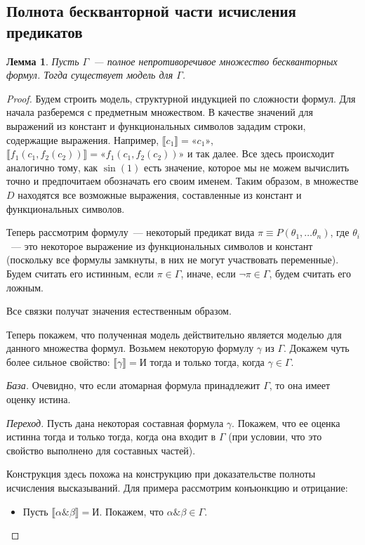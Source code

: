 \documentclass[a4paper,11pt]{article}
\newtheorem{lmm}[thm]{Лемма}
\theoremstyle{definition}
\newcommand{\True}{\text{И}}
\newcommand{\amp}{\mathbin{\&}}
\newcommand{\gn}[1]{\text{«}#1\text{»}}
\begin{document}
\subsection{Полнота бескванторной части исчисления предикатов}
\begin{lmm}\label{lmm:qf-model}
Пусть $\Gamma$~--- полное непротиворечивое множество бескванторных формул. Тогда
существует модель для $\Gamma$.
\end{lmm}
\begin{proof}
Будем строить модель, структурной индукцией по сложности формул. Для начала
разберемся с предметным множеством. В качестве значений для выражений из
констант и функциональных символов зададим строки, содержащие выражения.
Например, $\llbracket c_1\rrbracket = \gn{c_1}$, $\llbracket f_1(c_1,
f_2(c_2))\rrbracket = \gn{f_1(c_1, f_2(c_2))}$ и так далее. Все здесь
происходит аналогично тому, как $\sin(1)$ есть значение, которое мы не можем
вычислить точно и предпочитаем обозначать его своим именем. Таким образом, в
множестве $D$ находятся все возможные выражения, составленные из констант и
функциональных символов.

Теперь рассмотрим формулу~--- некоторый предикат вида $\pi \equiv P(\theta_1,
\dots \theta_n)$, где $\theta_i$~--- это некоторое выражение из функциональных
символов и констант (поскольку все формулы замкнуты, в них не могут участвовать
переменные). Будем считать его истинным, если $\pi \in \Gamma$, иначе, если
$\neg\pi \in \Gamma$, будем считать его ложным.

Все связки получат значения естественным образом.

Теперь покажем, что полученная модель действительно является моделью для
данного множества формул. Возьмем некоторую формулу $\gamma$ из $\Gamma$.
Докажем чуть более сильное свойство: $\llbracket\gamma\rrbracket = \True$ тогда
и только тогда, когда $\gamma \in \Gamma$.

\emph{База.} Очевидно, что если атомарная формула принадлежит $\Gamma$, то она
имеет оценку истина.

\emph{Переход.} Пусть дана некоторая составная формула $\gamma$. Покажем, что
ее оценка истинна тогда и только тогда, когда она входит в $\Gamma$ (при
условии, что это свойство выполнено для составных частей).

Конструкция здесь похожа на конструкцию при доказательстве полноты исчисления
высказываний. Для примера рассмотрим конъюнкцию и отрицание:
\begin{itemize}
\item Пусть $\llbracket\alpha \amp \beta\rrbracket = \True$. Покажем, что
  $\alpha \amp \beta \in \Gamma$.


\end{itemize}
\end{proof}
\end{document}
